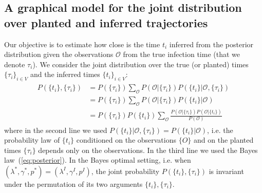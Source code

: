 \documentclass[a4paper, amsfonts, amssymb, amsmath, reprint, showkeys, nofootinbib, twoside, floatfix, pre,superscriptaddress]{revtex4-2}
\begin{document}
\subsection{A graphical model for the joint distribution over planted and inferred trajectories}
Our objective is to estimate how close is the time $t_i$ inferred from the posterior distribution given the observations $\mathcal{O}$ from the true infection time (that we denote $\tau_i$). 
We consider the joint distribution over the true (or planted) times $\{\tau_i\}_{i\in V}$ and the inferred times $\{t_i\}_{i\in V}$:
\begin{align}
\label{eq:joint}
\begin{aligned}
	P(\{t_i\}, \{\tau_i\}) &= P(\{\tau_i\})\sum_{\mathcal{O}}P(\mathcal{O}|\{\tau_i\})P(\{t_i\}|\mathcal{O},\{\tau_i\})\\
	&= P(\{\tau_i\})\sum_{\mathcal{O}}P(\mathcal{O}|\{\tau_i\})P(\{t_i\}|\mathcal{O})\\
	&=P(\{\tau_i\})P(\{t_i\})\sum_{\mathcal{O}}\frac{P(\mathcal{O}|\{\tau_i\})P(\mathcal{O}|\{t_i\})}{P(\mathcal{O})}
\end{aligned}
\end{align}
where in the second line we used $P(\{t_i\}|\mathcal{O},\{\tau_i\})=P(\{t_i\}|\mathcal{O})$, i.e. the probability law of $\{t_i\}$ conditioned on the observations $\{O\}$ and on the planted times $\{\tau_i\}$ depends only on the observations. In the third line we used the Bayes law~(\ref{eq:posterior}).
In the Bayes optimal setting, i.e. when $(\lambda^*, \gamma^*, p^*)=(\lambda^I, \gamma^I, p^I)$, the joint probability $P(\{t_i\}, \{\tau_i\})$ is invariant under the permutation of its two arguments $\{t_i\}, \{\tau_i\}$.
\end{document}
